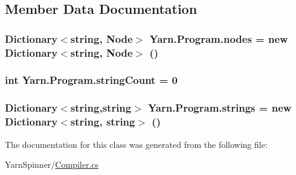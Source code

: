 \subsection{Member Data Documentation}
\hypertarget{a00081_a3f4928a577c88263ad016be259b175c4}{
\subsubsection[{nodes}]{\setlength{\rightskip}{0pt plus 5cm}Dictionary$<$string, {\bf Node}$>$ Yarn.\-Program.\-nodes = new Dictionary$<$string, {\bf Node}$>$ ()}}\label{a00081_a3f4928a577c88263ad016be259b175c4}
\hypertarget{a00081_a8ef1d10094ef00311aade6715ba78ec7}{
\subsubsection[{string\-Count}]{\setlength{\rightskip}{0pt plus 5cm}int Yarn.\-Program.\-string\-Count = 0\hspace{0.3cm}{\ttfamily [private]}}}\label{a00081_a8ef1d10094ef00311aade6715ba78ec7}
\hypertarget{a00081_a91518fda7e41bf573f66c6946dd3b4cb}{
\subsubsection[{strings}]{\setlength{\rightskip}{0pt plus 5cm}Dictionary$<$string,string$>$ Yarn.\-Program.\-strings = new Dictionary$<$string, string$>$ ()}}\label{a00081_a91518fda7e41bf573f66c6946dd3b4cb}


The documentation for this class was generated from the following file\-:\begin{DoxyCompactItemize}
\item 
Yarn\-Spinner/\hyperlink{a00137}{Compiler.\-cs}\end{DoxyCompactItemize}

